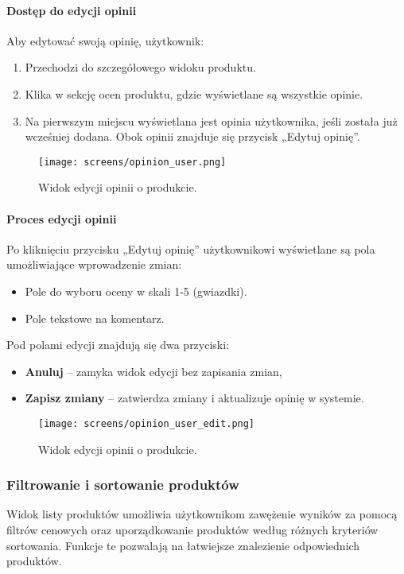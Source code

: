 \documentclass[12pt,a4paper,oneside]{article}
\theoremstyle{definition}
\numberwithin{equation}{section}
\begin{document}
\paragraph{Dostęp do edycji opinii}
Aby edytować swoją opinię, użytkownik:
\begin{enumerate}
    \item Przechodzi do szczegółowego widoku produktu.
    \item Klika w sekcję ocen produktu, gdzie wyświetlane są wszystkie opinie.
    \item Na pierwszym miejscu wyświetlana jest opinia użytkownika, jeśli została już wcześniej dodana. Obok opinii znajduje się przycisk „Edytuj opinię”.
\end{enumerate}
\begin{figure}[H]
    \centering
    \texttt{[image: screens/opinion\_user.png]}
    \caption{Widok edycji opinii o produkcie.}
    \label{fig:opinion_user}
\end{figure}
\paragraph{Proces edycji opinii}
Po kliknięciu przycisku „Edytuj opinię” użytkownikowi wyświetlane są pola umożliwiające wprowadzenie zmian:
\begin{itemize}
    \item Pole do wyboru oceny w skali 1-5 (gwiazdki).
    \item Pole tekstowe na komentarz.
\end{itemize}
Pod polami edycji znajdują się dwa przyciski:
\begin{itemize}
    \item \textbf{Anuluj} – zamyka widok edycji bez zapisania zmian,
    \item \textbf{Zapisz zmiany} – zatwierdza zmiany i aktualizuje opinię w systemie.
\end{itemize}

\begin{figure}[H]
    \centering
    \texttt{[image: screens/opinion\_user\_edit.png]}
    \caption{Widok edycji opinii o produkcie.}
    \label{fig:opinion_user_edit}
\end{figure}




\subsubsection{Filtrowanie i sortowanie produktów}
Widok listy produktów umożliwia użytkownikom zawężenie wyników za pomocą filtrów cenowych oraz uporządkowanie produktów według różnych kryteriów sortowania. Funkcje te pozwalają na łatwiejsze znalezienie odpowiednich produktów.
\end{document}
